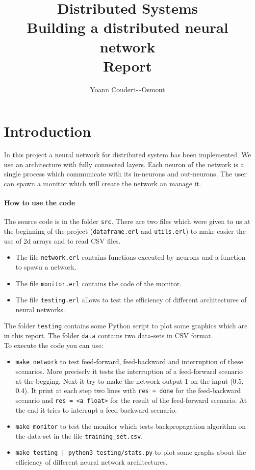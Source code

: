 \documentclass[12pt]{article}
\title{
	Distributed Systems\\
	\textbf{Building a distributed neural network}\\
	Report
}
\author{
	Yoann Coudert-\,-Osmont
}
\begin{document}
	
\maketitle

\section{Introduction}

In this project a neural network for distributed system has been implemented. We use an architecture with fully connected layers. Each neuron of the network is a single process which communicate with its in-neurons and out-neurons. The user can spawn a monitor which will create the network an manage it.

\paragraph{How to use the code}
The source code is in the folder \verb|src|. There are two files which were given to us at the beginning of the project (\verb|dataframe.erl| and \verb|utils.erl|) to make easier the use of 2d arrays and to read CSV files.
\begin{itemize}
	\item The file \verb|network.erl| contains functions executed by neurons and a function to spawn a network.
	\item The file \verb|monitor.erl| contains the code of the monitor.
	\item The file \verb|testing.erl| allows to test the efficiency of different architectures of neural networks.
\end{itemize}
The folder \verb|testing| contains some Python script to plot some graphics which are in this report. The folder \verb|data| contains two data-sets in CSV format. \\
To execute the code you can use:
\begin{itemize}
	\item \verb|make network| to test feed-forward, feed-backward and interruption of these scenarios. More precisely it tests the interruption of a feed-forward scenario at the begging. Next it try to make the network output 1 on the input (0.5, 0.4). It print at each step two lines with \verb|res = done| for the feed-backward scenario and \verb|res = <a float>| for the result of the feed-forward scenario. At the end it tries to interrupt a feed-backward scenario.
	\item \verb|make monitor| to test the monitor which tests backpropagation algorithm on the data-set in the file \verb|training_set.csv|.
	\item \verb=make testing | python3 testing/stats.py= to plot some graphs about the efficiency of different neural network architectures.
\end{itemize}
\end{document}
